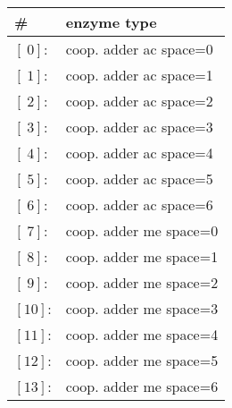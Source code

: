             \begin{figure}[htpb!]
                \centering
                \caption{}
                \label{img:nonCyclBistability_runPlot}
            \end{figure}
            \begin{figure}[htpb!]
                    \vspace{.3cm}
                    \begin{center}
                    \small
                    \begin{minipage}{.49\textwidth}
                        \begin{tabular}{l l}
                            \hline
                            \textbf{\#} & \textbf{enzyme type} \\
                            \hline
                            $[\ 0]$: & coop. adder ac space=0 \\
                            $[\ 1]$: & coop. adder ac space=1 \\
                            $[\ 2]$: & coop. adder ac space=2 \\
                            $[\ 3]$: & coop. adder ac space=3 \\
                            $[\ 4]$: & coop. adder ac space=4 \\
                            $[\ 5]$: & coop. adder ac space=5 \\
                            $[\ 6]$: & coop. adder ac space=6 \\\hline
                            $[\ 7]$: & coop. adder me space=0 \\
                            $[\ 8]$: & coop. adder me space=1 \\
                            $[\ 9]$: & coop. adder me space=2 \\
                            $[10]$: & coop. adder me space=3 \\
                            $[11]$: & coop. adder me space=4 \\
                            $[12]$: & coop. adder me space=5 \\
                            $[13]$: & coop. adder me space=6 \\\hline

\end{tabular}
\end{minipage}
\end{center}
\end{figure}
